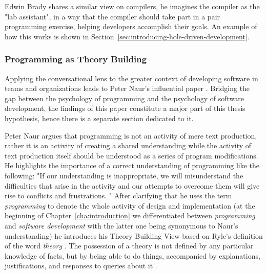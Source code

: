 Edwin Brady shares a similar view on compilers, he imagines the compiler as the "lab assistant", in a way that the compiler should take part in a pair programming exercise, helping developers accomplish their goals.
An example of how this works is shown in Section~\ref{sec:introducing-hole-driven-development}.


\subsubsection{Programming as Theory Building}
\label{sec:programming-as-theory-building}
Applying the conversational lens to the greater context of developing software in teams and organizations leads to Peter Naur's influential paper .
Bridging the gap between the psychology of programming and the psychology of software development, the findings of this paper constitute a major part of this thesis hypothesis, hence there is a separate section dedicated to it.

Peter Naur argues that programming is not an activity of mere text production, rather it is an activity of creating a shared understanding while the activity of text production itself should be understood as a series of program modifications.
He highlights the importance of a correct understanding of programming like the following: "If our understanding is inappropriate, we will misunderstand the difficulties that arise in the activity and our attempts to overcome them will give rise to conflicts and frustrations. \cite{naur_programming_1985}"
After clarifying that he uses the term \emph{programming} to denote the whole activity of design and implementation (at the beginning of Chapter~\ref{cha:introduction} we differentiated between \emph{programming} and \emph{software development} with the latter one being synonymous to Naur's understanding) he introduces his Theory Building View based on Ryle's definition of the word \emph{theory} \cite{ryle_concept_1984}.
The possession of a theory is not defined by any particular knowledge of facts, but by being able to do things, accompanied by explanations, justifications, and responses to queries about it \cite{barn_revisiting_2011}.

